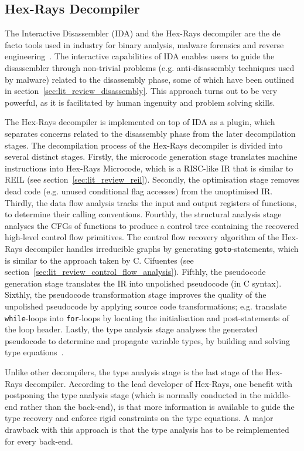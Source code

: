 
\subsection{Hex-Rays Decompiler}
\label{sec:rel_work_hex-rays_decompiler}

The Interactive Disassembler (IDA) and the Hex-Rays decompiler are the de facto tools used in industry for binary analysis, malware forensics and reverse engineering~\cite{semantics_preserving_structural_analysis}. The interactive capabilities of IDA enables users to guide the disassembler through non-trivial problems (e.g. anti-disassembly techniques used by malware) related to the disassembly phase, some of which have been outlined in section~\ref{sec:lit_review_disassembly}. This approach turns out to be very powerful, as it is facilitated by human ingenuity and problem solving skills.

The Hex-Rays decompiler is implemented on top of IDA as a plugin, which separates concerns related to the disassembly phase from the later decompilation stages. The decompilation process of the Hex-Rays decompiler is divided into several distinct stages. Firstly, the microcode generation stage translates machine instructions into Hex-Rays Microcode, which is a RISC-like IR that is similar to REIL (see section~\ref{sec:lit_review_reil}). Secondly, the optimisation stage removes dead code (e.g. unused conditional flag accesses) from the unoptimised IR. Thirdly, the data flow analysis tracks the input and output registers of functions, to determine their calling conventions. Fourthly, the structural analysis stage analyses the CFGs of functions to produce a control tree containing the recovered high-level control flow primitives. The control flow recovery algorithm of the Hex-Rays decompiler handles irreducible graphs by generating \texttt{goto}-statements, which is similar to the approach taken by C. Cifuentes (see section~\ref{sec:lit_review_control_flow_analysis}). Fifthly, the pseudocode generation stage translates the IR into unpolished pseudocode (in C syntax). Sixthly, the pseudocode transformation stage improves the quality of the unpolished pseudocode by applying source code transformations; e.g. translate \texttt{while}-loops into \texttt{for}-loops by locating the initialisation and post-statements of the loop header. Lastly, the type analysis stage analyses the generated pseudocode to determine and propagate variable types, by building and solving type equations~\cite{hexrays}.

Unlike other decompilers, the type analysis stage is the last stage of the Hex-Rays decompiler. According to the lead developer of Hex-Rays, one benefit with postponing the type analysis stage (which is normally conducted in the middle-end rather than the back-end), is that more information is available to guide the type recovery and enforce rigid constraints on the type equations. A major drawback with this approach is that the type analysis has to be reimplemented for every back-end.
